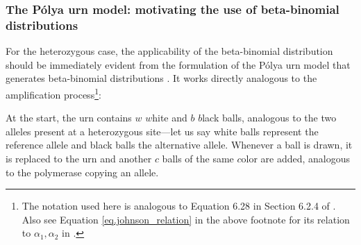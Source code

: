 \documentclass[authoryear,preprint,11pt]{scrartcl}
\begin{document}
\subsubsection{The Pólya urn model: motivating the use of beta-binomial distributions}\label{sec:polya-urn}

For the heterozygous case, the applicability of the beta-binomial distribution \citep{irwin_distribution_1954} should be immediately evident from the formulation of the Pólya urn model \citep{eggenberger_uber_1923} that generates beta-binomial distributions \citep{irwin_distribution_1954,johnson_univariate_2005}.
It works directly analogous to the amplification process\footnote{The notation used here is analogous to Equation 6.28 in Section 6.2.4 of \cite{johnson_univariate_2005}. Also see Equation \ref{eq.johnson_relation} in the above footnote for its relation to $\alpha_1, \alpha_2$ in \cite{lodato_somatic_2015}.}:

At the start, the urn contains $w$ $w$hite and $b$ $b$lack balls, analogous to the two alleles present at a heterozygous site---let us say white balls represent the reference allele and black balls the alternative allele.
Whenever a ball is drawn, it is replaced to the urn and another $c$ balls of the same $c$olor are added, analogous to the polymerase copying an allele.
\end{document}
